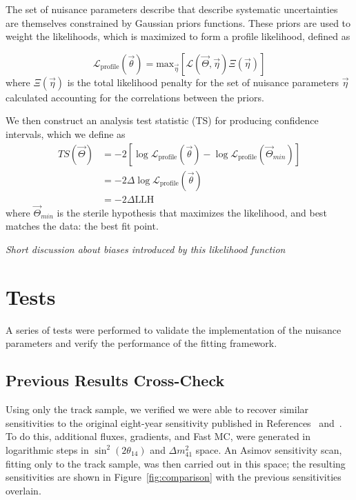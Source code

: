 \documentclass[main.tex]{subfiles}
\begin{document}
The set of nuisance parameters describe that describe systematic uncertainties are themselves constrained by Gaussian priors functions. 
These priors are used to weight the likelihoods, which is maximized to form a profile likelihood, defined as 

\begin{equation}
\mathcal{L}_{\text{profile}}\left(\vec{\theta}\right) = \text{max}_{\vec{\eta}}\left[\mathcal{L}(\vec{\Theta}, \vec{\eta}) \Xi(\vec{\eta}) \right]
\end{equation}
where $\Xi(\vec{\eta})$ is the total likelihood penalty for the set of nuisance parameters $\vec{\eta}$ calculated accounting for the correlations between the priors. 

We then construct an analysis test statistic (TS) for producing confidence intervals, which we define as 
\begin{equation}\begin{split}
TS(\vec{\Theta}) &= -2\left[ \log\mathcal{L}_{\text{profile}}(\vec{\theta}) - \log\mathcal{L}_{\text{profile}}(\vec{\Theta}_{min}) \right] \\
&= -2 \Delta \log\mathcal{L}_{\text{profile}}(\vec{\theta})\\
&=-2\Delta \text{LLH}
\end{split}\end{equation}
where $\vec{\Theta}_{min}$ is the sterile hypothesis that maximizes the likelihood, and best matches the data: the best fit point. 

\textit{Short discussion about biases introduced by this likelihood function}

\section{Tests}

A series of tests were performed to validate the implementation of the nuisance parameters and verify the performance of the fitting framework. 

\subsection{Previous Results Cross-Check}

Using only the track sample, we verified we were able to recover similar sensitivities to the original eight-year sensitivity published in References~\cite{Aartsen_2020} and~\cite{Aartsen_2020_prd}. 
To do this, additional fluxes, gradients, and Fast MC, were generated in logarithmic steps in $\sin^{2}(2\theta_{14})$ and $\Delta m_{41}^{2}$ space.
An Asimov sensitivity scan, fitting only to the track sample, was then carried out in this space; the resulting sensitivities are shown in Figure~\ref{fig:comparison} with the previous sensitivities overlain. 
\end{document}
